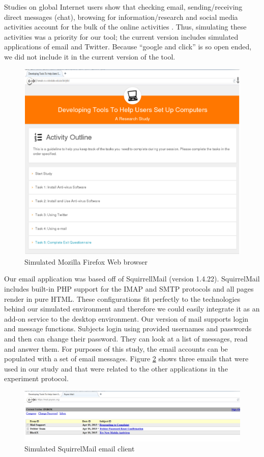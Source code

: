 Studies on global Internet users show that checking email, sending/receiving direct messages (chat), browsing for information/research and social media activities account for the bulk of the online activities \cite{furnell2007, worldinternet2018}. Thus, simulating these activities was a priority for our tool; the current version includes simulated applications of email and Twitter. Because ``google and click'' is so open ended, we did not include it in the current version of the tool.

\begin{figure}[tpb]
  \centering
\includegraphics[width=\columnwidth, keepaspectratio=true]{img/browser.png}
  \caption{Simulated Mozilla Firefox Web browser}
  \label{fig:browser}
\end{figure}

Our email application was based off of SquirrellMail (version 1.4.22). SquirrelMail includes built-in PHP support for the IMAP and SMTP protocols and all pages render in pure HTML. These configurations fit perfectly to the technologies behind our simulated environment and therefore we could easily integrate it as an add-on service to the desktop environment. Our version of mail supports login and message functions. Subjects login using provided usernames and passwords and then can change their password. They can look at a list of messages, read and answer them. For purposes of this study, the email accounts can be populated with a set of email messages. Figure \ref{fig:mail} shows three emails that were used in our study and that were related to the other applications in the experiment protocol.
\begin{figure}[tpb]
  \centering
\includegraphics[width=\columnwidth, keepaspectratio=true]{img/mail.png}
  \caption{Simulated SquirrelMail email client}
  \label{fig:mail}
\end{figure}

